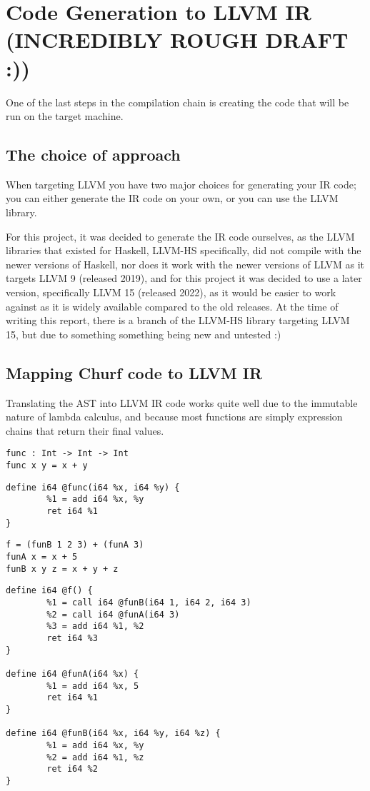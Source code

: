 \section{Code Generation to LLVM IR (INCREDIBLY ROUGH DRAFT :))}
One of the last steps in the compilation chain is creating the code that will  
be run on the target machine.

\subsection{The choice of approach}
When targeting LLVM you have two major choices for generating your IR code; 
you can either generate the IR code on your own, or you can use the LLVM library.

For this project, it was decided to generate the IR code ourselves, as 
the LLVM libraries that existed for Haskell, LLVM-HS specifically, did not compile 
with the newer versions of Haskell, nor does it work with the newer versions of 
LLVM as it targets LLVM 9 (released 2019), and for this project it was decided to use a later
version, specifically LLVM 15 (released 2022), as it would be easier to work against
as it is widely available compared to the old releases. At the time of writing this report,
there is a branch of the LLVM-HS library targeting LLVM 15, but due to something something being new and untested :)

\subsection{Mapping Churf code to LLVM IR}
Translating the AST into LLVM IR code works quite well due to the immutable nature of lambda calculus,
and because most functions are simply expression chains that return their final values.

\begin{verbatim}
func : Int -> Int -> Int
func x y = x + y
\end{verbatim}
\begin{verbatim}
define i64 @func(i64 %x, i64 %y) {
    	%1 = add i64 %x, %y
    	ret i64 %1
}
\end{verbatim}

\begin{verbatim}
f = (funB 1 2 3) + (funA 3)
funA x = x + 5
funB x y z = x + y + z
\end{verbatim}
\begin{verbatim}
define i64 @f() {
    	%1 = call i64 @funB(i64 1, i64 2, i64 3)
    	%2 = call i64 @funA(i64 3)
    	%3 = add i64 %1, %2
    	ret i64 %3
}

define i64 @funA(i64 %x) {
    	%1 = add i64 %x, 5
    	ret i64 %1
}

define i64 @funB(i64 %x, i64 %y, i64 %z) {
    	%1 = add i64 %x, %y
    	%2 = add i64 %1, %z
    	ret i64 %2
}
\end{verbatim}


